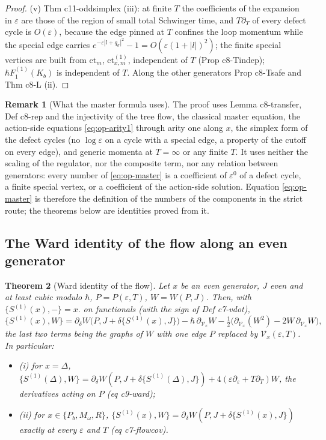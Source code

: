 \documentclass[11pt]{article}
\numberwithin{equation}{section}
\theoremstyle{plain}
\newtheorem{theorem}{Theorem}[section]
\theoremstyle{definition}
\newtheorem{remark}[theorem]{Remark}
\newcommand{\ct}{\mathrm{ct}}
\newcommand{\Var}{\mathcal V}
\begin{document}
\begin{proof}
(v) Thm c11-oddsimplex (iii): at finite $T$ the coefficients of the expansion in $\varepsilon$ are those of the region of small total Schwinger time, and $T\partial_T$ of every defect cycle is $O(\varepsilon)$, because the edge pinned at $T$ confines the loop momentum while the special edge carries $e^{-\varepsilon|l+q_\sigma|^2}-1=O(\varepsilon(1+|l|)^2)$; the finite special vertices are built from $\ct_m$, $\ct^{(1)}_{x,m}$, independent of $T$ (Prop c8-Tindep); $\hbar F_1^{(1)}(K_b)$ is independent of $T$. Along the other generators Prop c8-Tsafe and Thm c8-L (ii).
\end{proof}

\begin{remark}[What the master formula uses]
\label{rem:op-masteruses}
The proof uses Lemma c8-transfer, Def c8-rep and the injectivity of the tree flow, the classical master equation, the action-side equations \eqref{eq:op-arity1} through arity one along $x$, the simplex form of the defect cycles (no $\log\varepsilon$ on a cycle with a special edge, a property of the cutoff on every edge), and generic momenta at $T=\infty$ or any finite $T$. It uses neither the scaling of the regulator, nor the composite term, nor any relation between generators: every number of \eqref{eq:op-master} is a coefficient of $\varepsilon^0$ of a defect cycle, a finite special vertex, or a coefficient of the action-side solution. Equation \eqref{eq:op-master} is therefore the definition of the numbers of the components in the strict route; the theorems below are identities proved from it.
\end{remark}

\subsection{The Ward identity of the flow along an even generator}

\begin{theorem}[Ward identity of the flow]
\label{thm:op-ward}
Let $x$ be an even generator, $J$ even and at least cubic modulo $\hbar$, $P=P(\varepsilon,T)$, $W=W(P,J)$. Then, with $\{S^{(1)}(x),-\}=x.$ on functionals (with the sign of Def c7-vdot),
\begin{equation}
\{S^{(1)}(x),W\}=\partial_\delta W\big(P,J+\delta\{S^{(1)}(x),J\}\big)-\hbar\,\partial_{\Var_x}W-\tfrac12\big(\partial_{\Var_x}(W^2)-2W\,\partial_{\Var_x}W\big),
\label{eq:op-ward}
\end{equation}
the last two terms being the graphs of $W$ with one edge $P$ replaced by $\Var_x(\varepsilon,T)$. In particular:
\begin{itemize}
\item (i) for $x=\Delta$, $\{S^{(1)}(\Delta),W\}=\partial_\delta W(P,J+\delta\{S^{(1)}(\Delta),J\})+4(\varepsilon\partial_\varepsilon+T\partial_T)W$, the derivatives acting on $P$ (eq c9-ward);
\item (ii) for $x\in\{P_b,M_\omega,R\}$, $\{S^{(1)}(x),W\}=\partial_\delta W(P,J+\delta\{S^{(1)}(x),J\})$ exactly at every $\varepsilon$ and $T$ (eq c7-flowcov).
\end{itemize}
\end{theorem}
\end{document}
